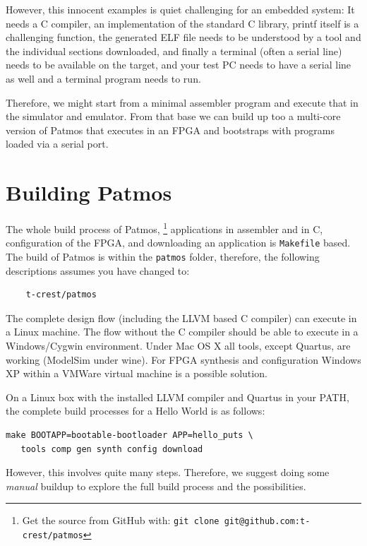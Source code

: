 \documentclass[a4paper,fontsize=10pt,twoside,DIV15,BCOR12mm,headinclude=true,footinclude=false,pagesize,bibtotoc]{scrbook}
\newcommand{\code}[1]{{\texttt{#1}}}
\begin{document}
However, this innocent examples is quiet challenging for an embedded system:
It needs a C compiler, an implementation of the standard C library, printf
itself is a challenging function, the generated ELF file needs to be understood
by a tool and the individual sections downloaded, and finally a terminal (often
a serial line) needs to be available on the target, and your test PC needs to
have a serial line as well and a terminal program needs to run.

Therefore, we might start from a minimal assembler program and execute
that in the simulator and emulator. From that base we can build up too
a multi-core version of Patmos that executes in an FPGA and bootstraps
with programs loaded via a serial port.


\section{Building Patmos}

The whole build process of Patmos,%
\footnote{Get the source from GitHub with: \code{git clone git@github.com:t-crest/patmos}}
applications in assembler
and in C, configuration of the FPGA, and downloading an application
is \code{Makefile} based. The build of Patmos is within the \code{patmos} folder,
therefore, the following descriptions assumes you have changed to:

\begin{verbatim}
    t-crest/patmos
\end{verbatim}


The complete design flow (including the LLVM
based C compiler) can execute in a Linux machine. The flow without
the C compiler should be able to execute in a Windows/Cygwin environment.
Under Mac OS X all tools, except Quartus, are working (ModelSim under
wine). For FPGA synthesis and configuration Windows XP within a VMWare
virtual machine is a possible solution.

On a Linux box with the installed LLVM compiler and Quartus in your PATH,
the complete build processes for a Hello World is as follows:

\begin{verbatim}
make BOOTAPP=bootable-bootloader APP=hello_puts \
   tools comp gen synth config download
\end{verbatim}

However, this involves quite many steps. Therefore, we suggest doing some \emph{manual}
buildup to explore the full build process and the possibilities.
\end{document}
